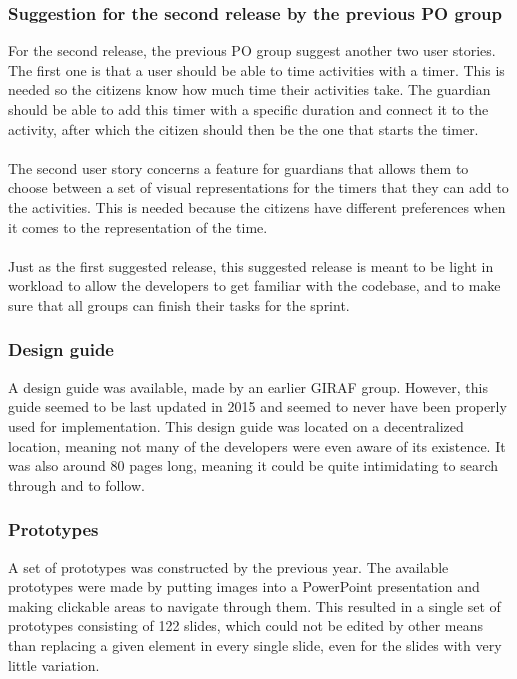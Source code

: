 \subsubsection{Suggestion for the second release by the previous PO group}
For the second release, the previous PO group suggest another two user stories.
The first one is that a user should be able to time activities with a timer.
This is needed so the citizens know how much time their activities take.
The guardian should be able to add this timer with a specific duration and connect it to the activity, after which the citizen should then be the one that starts the timer.
\\\\
The second user story concerns a feature for guardians that allows them to choose between a set of visual representations for the timers that they can add to the activities.
This is needed because the citizens have different preferences when it comes to the representation of the time.
\\\\
Just as the first suggested release, this suggested release is meant to be light in workload to allow the developers to get familiar with the codebase, and to make sure that all groups can finish their tasks for the sprint.

\subsubsection{Design guide}
A design guide was available, made by an earlier GIRAF group.
However, this guide seemed to be last updated in 2015 and seemed to never have been properly used for implementation.
This design guide was located on a decentralized location, meaning not many of the developers were even aware of its existence.
It was also around 80 pages long, meaning it could be quite intimidating to search through and to follow.

\subsubsection{Prototypes}
A set of prototypes was constructed by the previous year.
The available prototypes were made by putting images into a PowerPoint presentation and making clickable areas to navigate through them.
This resulted in a single set of prototypes consisting of 122 slides, which could not be edited by other means than replacing a given element in every single slide, even for the slides with very little variation.



